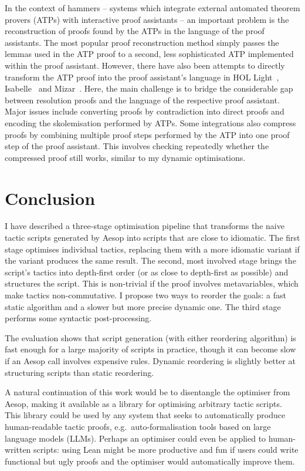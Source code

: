 \documentclass[sigplan,screen]{acmart}
\begin{document}
In the context of hammers -- systems which integrate external automated theorem provers (ATPs) with interactive proof assistants -- an important problem is the reconstruction of proofs found by the ATPs in the language of the proof assistants.
The most popular proof reconstruction method simply passes the lemmas used in the ATP proof to a second, less sophisticated ATP implemented within the proof assistant.
However, there have also been attempts to directly transform the ATP proof into the proof assistant's language in HOL Light~\cite{PRocH}, Isabelle~\cite{Paulson2007,Blanchette2013a,Blanchette2013b,Blanchette2016} and Mizar~\cite{ATPMizar,MizarATP}.
Here, the main challenge is to bridge the considerable gap between resolution proofs and the language of the respective proof assistant.
Major issues include converting proofs by contradiction into direct proofs and encoding the skolemisation performed by ATPs.
Some integrations also compress proofs by combining multiple proof steps performed by the ATP into one proof step of the proof assistant.
This involves checking repeatedly whether the compressed proof still works, similar to my dynamic optimisations.

\section{Conclusion}%
\label{sec:concl}

I have described a three-stage optimisation pipeline that transforms the naive tactic scripts generated by Aesop into scripts that are close to idiomatic.
The first stage optimises individual tactics, replacing them with a more idiomatic variant if the variant produces the same result.
The second, most involved stage brings the script's tactics into depth-first order (or as close to depth-first as possible) and structures the script.
This is non-trivial if the proof involves metavariables, which make tactics non-commutative.
I propose two ways to reorder the goals: a fast static algorithm and a slower but more precise dynamic one.
The third stage performs some syntactic post-processing.

The evaluation shows that script generation (with either reordering algorithm) is fast enough for a large majority of scripts in practice, though it can become slow if an Aesop call involves expensive rules.
Dynamic reordering is slightly better at structuring scripts than static reordering.

A natural continuation of this work would be to disentangle the optimiser from Aesop, making it available as a library for optimising arbitrary tactic scripts.
This library could be used by any system that seeks to automatically produce human-readable tactic proofs, e.g.\ auto-formalisation tools based on large language models (LLMs).
Perhaps an optimiser could even be applied to human-written scripts:
using Lean might be more productive and fun if users could write functional but ugly proofs and the optimiser would automatically improve them.
\end{document}
